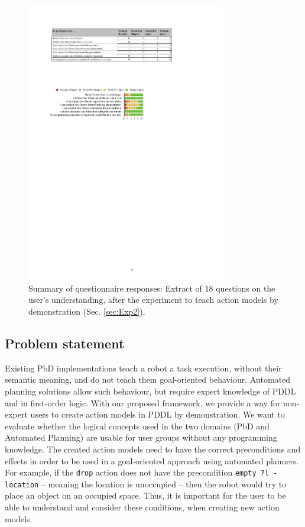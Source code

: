  \begin{figure}[t]
  \centering
  \includegraphics[width=8.7cm]{figures/eEvaluation1}
  \caption{Summary of questionnaire responses: Extract of 18 questions on the user's understanding, after the experiment to teach action models by demonstration (Sec. \ref{sec:Exp2}).}
  \label{fig:eEvaluation1}
\end{figure}





\subsection{Problem statement}
Existing PbD implementations teach a robot a task execution, without their semantic meaning, and do not teach them goal-oriented behaviour. Automated planning solutions allow such behaviour, but require expert knowledge of PDDL and in first-order logic. With our proposed framework, we provide a way for non-expert users to create action models in PDDL by demonstration. We want to evaluate whether the logical concepts used in the two domains (PbD and Automated Planning) are usable for user groups without any programming knowledge.
The created action models need to have the correct preconditions and effects in order to be used in a goal-oriented approach using automated planners. For example, if the \texttt{drop} action does not have the precondition \texttt{empty ?l - location} -- meaning the location is unoccupied -- then the robot would try to place an object on an occupied space. Thus, it is important for the user to be able to understand and consider these conditions, when creating new action models. 

